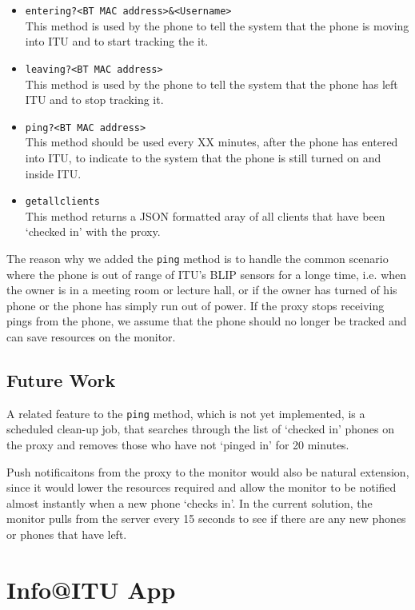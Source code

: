 \documentclass{ubicomp2011}
\begin{document}
\begin{itemize}
\item \texttt{entering?<BT MAC address>\&<Username>}\\
This method is used by the phone to tell the system that the phone is moving into ITU and to start tracking the it.
\item \texttt{leaving?<BT MAC address>}\\
This method is used by the phone to tell the system that the phone has left ITU and to stop tracking it.
\item \texttt{ping?<BT MAC address>}\\
This method should be used every XX minutes, after the phone has entered into ITU, to indicate to the system that the phone is still turned on and inside ITU.
\item \texttt{getallclients}\\
This method returns a JSON formatted aray of all clients that have been `checked in’ with the proxy.
\end{itemize}

The reason why we added the \texttt{ping} method is to handle the common scenario where the phone is out of range of ITU's BLIP sensors for a longe time, i.e. when the owner is in a meeting room or lecture hall, or if the owner has turned of his phone or the phone has simply run out of power. If the proxy stops receiving pings from the phone, we assume that the phone should no longer be tracked and can save resources on the monitor.

\subsection{Future Work}

A related feature to the \texttt{ping} method, which is not yet implemented, is a scheduled clean-up job, that searches through the list of `checked in' phones on the proxy and removes those who have not `pinged in' for 20 minutes.

Push notificaitons from the proxy to the monitor would also be natural extension, since it would lower the resources required and allow the monitor to be notified almost instantly when a new phone `checks in'. In the current solution, the monitor pulls from the server every 15 seconds to see if there are any new phones or phones that have left.

\section{Info@ITU App}
\end{document}
